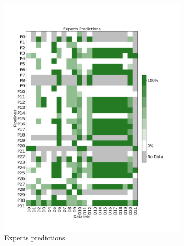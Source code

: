 \documentclass[conference]{IEEEtran}
\begin{document}
\begin{figure}
\centering
\begin{subfigure}{.49\textwidth}  \includegraphics[width=\columnwidth]{figures/Commented_Success_Percentage.pdf}
  \caption{Experts predictions}
  \label{fig:experts_matrix}
\end{subfigure} \hfill
\begin{subfigure}{.49\textwidth}

\end{subfigure}
\end{figure}
\end{document}
